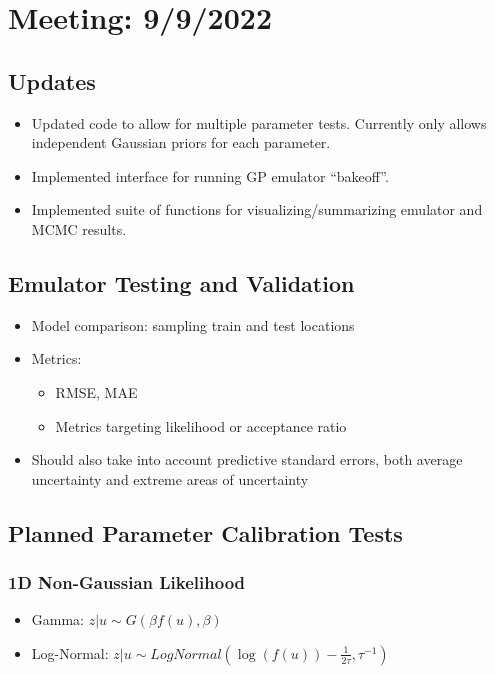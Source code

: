 \documentclass[12pt]{article}
\begin{document}
\section{Meeting: 9/9/2022}
\subsection{Updates}
\begin{itemize}
\item Updated code to allow for multiple parameter tests. Currently only allows independent Gaussian priors for each parameter. 
\item Implemented interface for running GP emulator ``bakeoff''. 
\item Implemented suite of functions for visualizing/summarizing emulator and MCMC results. 
\end{itemize}

\subsection{Emulator Testing and Validation}
\begin{itemize}
\item Model comparison: sampling train and test locations
\item Metrics:
	\begin{itemize}
	\item RMSE, MAE
	\item Metrics targeting likelihood or acceptance ratio
	\end{itemize}
\item Should also take into account predictive standard errors, both average uncertainty and extreme areas of uncertainty
\end{itemize}

\subsection{Planned Parameter Calibration Tests}
\subsubsection{1D Non-Gaussian Likelihood}
\begin{itemize}
\item Gamma: $z|u \sim G(\beta f(u), \beta)$
\item Log-Normal: $z|u \sim LogNormal\left(\log(f(u)) - \frac{1}{2\tau}, \tau^{-1}\right)$
\end{itemize}
\end{document}

